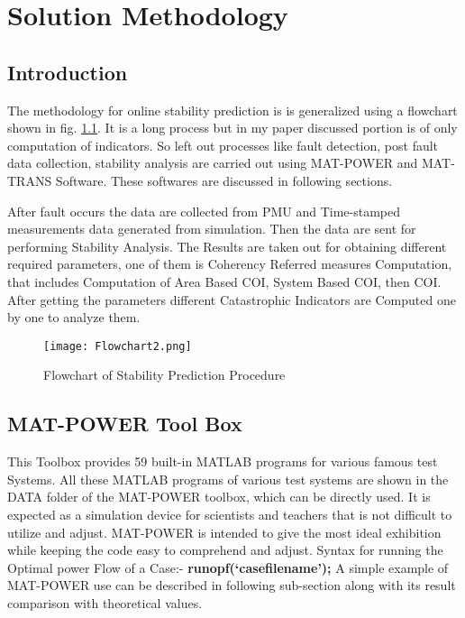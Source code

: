 \chapter{Solution Methodology}

\section{Introduction}
 The methodology for online stability prediction is is generalized using a flowchart shown in fig. \ref{Flowchart}. It is a long process but in my paper discussed portion is of only computation of indicators. So left out processes like fault detection, post fault data collection, stability analysis are carried out using MAT-POWER and MAT-TRANS Software. These softwares are discussed in following sections.\par
 After fault occurs the data are collected from PMU and Time-stamped measurements data generated from simulation. Then the data are sent for performing Stability Analysis. The Results are taken out for obtaining different required parameters, one of them is Coherency Referred measures
Computation, that includes Computation of Area Based COI,
System Based COI, then COI. After getting the parameters different Catastrophic Indicators are Computed one by
one to analyze them.
 
 \begin{figure}
	 \centering
	\texttt{[image: Flowchart2.png]}
	\caption{Flowchart of Stability Prediction Procedure}
	\label{Flowchart}
\end{figure} 

\section{MAT-POWER Tool Box}
 This Toolbox provides 59 built-in MATLAB programs for various famous test Systems. All these MATLAB programs of various test systems are shown in the DATA folder of the MAT-POWER toolbox, which can be directly used. It is expected as a simulation device for scientists and teachers that is not difficult to utilize and adjust. MAT-POWER is intended to give the most ideal exhibition while keeping the code easy to comprehend and adjust. Syntax for running the Optimal power Flow of a Case:- \textbf{runopf(‘casefilename’);} A simple example of MAT-POWER use can be described in following sub-section along with its result comparison with theoretical values.


